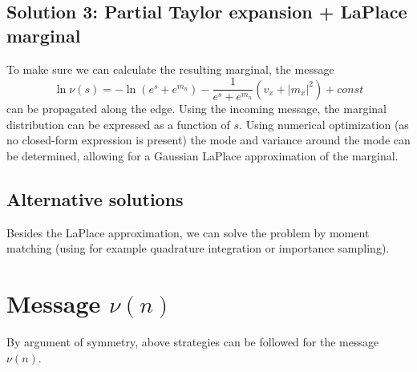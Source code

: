 \subsection{Solution 3: Partial Taylor expansion + LaPlace marginal}
To make sure we can calculate the resulting marginal, the message
\begin{equation}
    \ln \nu(s) = -\ln(e^s + e^{m_n}) - \frac{1}{e^s + e^{m_n}} (v_x + |m_x|^2) + \textit{const}
\end{equation}
can be propagated along the edge. Using the incoming message, the marginal distribution can be expressed as a function of $s$. Using numerical optimization (as no closed-form expression is present) the mode and variance around the mode can be determined, allowing for a Gaussian LaPlace approximation of the marginal.

\subsection{Alternative solutions}
Besides the LaPlace approximation, we can solve the problem by moment matching (using for example quadrature integration or importance sampling).


\section{Message $\nu(n)$}
By argument of symmetry, above strategies can be followed for the message $\nu(n)$.